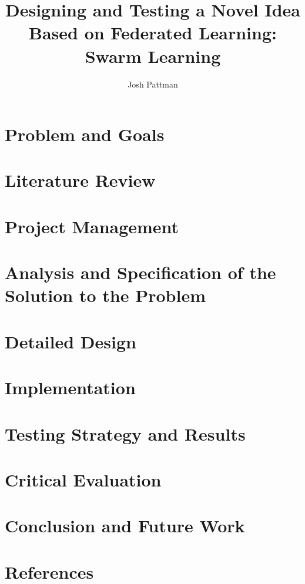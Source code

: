 \documentclass[12pt,a4paper]{report}
\author{Josh Pattman}
\title{Designing and Testing a Novel Idea Based on Federated Learning: Swarm Learning}
\begin{document}
	\maketitle
	\tableofcontents
	\chapter{Problem and Goals}
	\chapter{Literature Review}
	\chapter{Project Management}
	\chapter{Analysis and Specification of the Solution to the Problem}
	\chapter{Detailed Design}
	
	
	\chapter{Implementation}
	
	
	\chapter{Testing Strategy and Results}
	
	
	\chapter{Critical Evaluation}
	\chapter{Conclusion and Future Work}
	\chapter{References}
	
\end{document}
